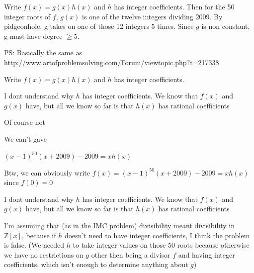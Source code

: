 \begin{solution}
	Write $ f(x) = g(x)h(x)$ and $ h$ has integer coefficients. Then for the 50 integer roots of $ f$, $ g(x)$ is one of the twelve integers dividing 2009. By pidgeonhole, g takes on one of those 12 integers 5 times. Since $ g$ is non constant, g must have degree $ \geq 5$.

PS: Basically the same as http://www.artofproblemsolving.com/Forum/viewtopic.php?t=217338
\end{solution}



\begin{solution}
	\begin{tcolorbox}Write $ f(x) = g(x)h(x)$ and $ h$ has integer coefficients.\end{tcolorbox}

I dont understand why $ h$ has integer coefficients. We know that $ f(x)$ and $ g(x)$ have, but all we know so far is that $ h(x)$ has rational coefficients
\end{solution}



\begin{solution}
	\begin{tcolorbox}Of course not

We can't gave

$ (x - 1)^{50}(x + 2009) - 2009 = x h(x)$

\end{tcolorbox}

Btw, we can obviously write $ f(x)=(x - 1)^{50}(x + 2009) - 2009 = x h(x)$ since $ f(0)=0$
\end{solution}



\begin{solution}
	\begin{tcolorbox}I dont understand why $ h$ has integer coefficients. We know that $ f(x)$ and $ g(x)$ have, but all we know so far is that $ h(x)$ has rational coefficients\end{tcolorbox}

I'm assuming that (as in the IMC problem) divisibility meant divisibility in $ \mathbb{Z}[x]$, because if $ h$ doesn't need to have integer coefficients, I think the problem is false. (We needed $ h$ to take integer values on those 50 roots because otherwise we have no restrictions on $ g$ other then being a divisor $ f$ and having integer coefficients, which isn't enough to determine anything about $ g$)
\end{solution}



